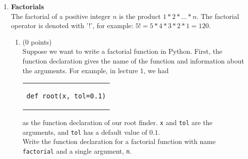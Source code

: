\documentclass{article}
\newcounter{points}
\newcommand\setzeropoints{\addtocounter{points}{0}(0 points)}
\begin{document}
\begin{enumerate}
\begin{enumerate}
\setcounter{enumii}{1}
\item \setzeropoints \\
Describe an abstraction that can be made for this function.  For example, in lecture, we changed our $\sqrt{7}$ function to a $\sqrt{x}$ function.
\end{enumerate}

\begin{enumerate}
\setcounter{enumii}{2}
\item \setzeropoints \\
Suppose that your abstraction from part (b) is implemented.  What function call can you make so that the function returns the same value as it would have before the abstraction was implemented?  For example, in lecture, we could make the call \texttt{root(7)}.
\end{enumerate}

\begin{enumerate}
\setcounter{enumii}{3}
\item \setzeropoints \\
Does your \texttt{errorcheck()} implementation in part (a) still make sense?
\end{enumerate}


\item \textbf{Factorials} \\
The factorial of a positive integer $n$ is the product $1 * 2 * \hdots * n$.  The factorial operator is denoted with '!', for example: $5! = 5 * 4 * 3 * 2 * 1 = 120$.

\begin{enumerate}
\item \setzeropoints \\
Suppose we want to write a factorial function in Python.  First, the function declaration gives the name of the function and information about the arguments.  For example, in lecture 1, we had

\begin{tabular}{c}
\begin{lstlisting}
def root(x, tol=0.1)
\end{lstlisting}
\end{tabular}

as the function declaration of our root finder.  \texttt{x} and \texttt{tol} are the arguments, and \texttt{tol} has a default value of $0.1$. \\

Write the function declaration for a factorial function with name \texttt{factorial} and a single argument, \texttt{n}.
\end{enumerate}


\end{enumerate}
\end{document}
